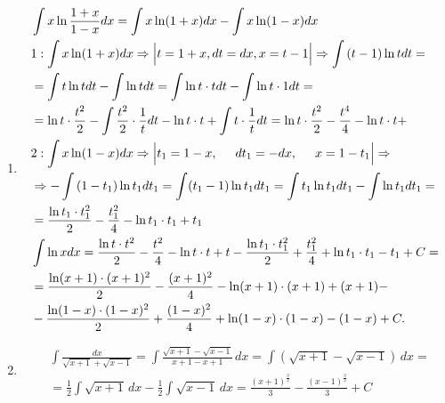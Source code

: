\documentclass[a4paper, 12pt]{article}
\begin{document}
\begin{enumerate}
  
  \item %
  \begin{align*}
   &\int{x \ln \frac{1+x}{1-x}dx} = \int{x \ln (1+x)dx} - \int{x \ln (1-x)dx} \\
   &1: \int{x \ln (1+x)dx} \Rightarrow
   \Big| t = 1+x, dt = dx, x=t-1 \Big| \Rightarrow 
   \int{(t-1) \ln t dt} = \\
   &=\int{t \ln t dt} - \int{\ln t dt} =
   \int{\ln t \cdot t dt }  -\int{\ln t \cdot 1dt} = \\
   &=\ln t \cdot \frac{t^2}{2} - \int {\frac{t^2}{2}\cdot\frac{1}{t} dt} - \ln t \cdot t + \int {t \cdot \frac{1}{t} dt} = \ln t \cdot \frac{t^2}{2}-\frac{t^4}{4}-\ln t \cdot t + \\
   &2: \int{x \ln (1-x) dx} \Rightarrow
   \Big| t_1 = 1-x, \hspace*{5mm} dt_1 = -dx,  \hspace*{5mm} x=1-t_1
   \Big| \Rightarrow \\
   &\Rightarrow
   -\int{(1-t_1)\ln t_1 dt_1} = \int (t_1 -1) \ln t_1 dt_1 = \int{t_1 \ln t_1 dt_1} -\int{ \ln t_1 dt_1} = \\
   &=\frac{\ln t_1 \cdot t^2_1}{2} - \frac{t^2_1}{4}-\ln t_1 \cdot t_1 + t_1 \\
   &\int{\ln x dx} = \frac{\ln t \cdot t^2}{2} - \frac{t^2}{4} - \ln t \cdot t + t - \frac{\ln t_1 \cdot t^2_1}{2} + \frac{t^2_1}{4} + \ln t_1 \cdot t_1 - t_1 + C = \\
   &=\frac{\ln (x+1) \cdot (x+1)^2}{2} - \frac{(x+1)^2}{4} - \ln (x+1) \cdot (x+1) + (x+1) - \\
   &- \frac{\ln (1-x) \cdot (1-x)^2}{2} + \frac{(1-x)^2}{4} + \ln (1-x)  \cdot (1-x)  - (1-x)  + C
  .\end{align*}
  
  
  \item %
  \begin{align*}
    &\int \frac{dx}{\sqrt{x+1}+\sqrt{x-1}} = \int \frac{\sqrt{x+1}-\sqrt{x-1}}{x+1-x+1}\,dx = \int \left(\sqrt{x+1}-\sqrt{x-1}\right)\,dx =\\
    &= \frac{1}{2} \int \sqrt{x+1}\,dx-\frac{1}{2}\int\sqrt{x-1}\,dx = \frac{\left(x+1\right)^\frac{3}{2}}{3} - \frac{\left(x-1\right)^\frac{3}{2}}{3} + C
  \end{align*}
  

\end{enumerate}
\end{document}
